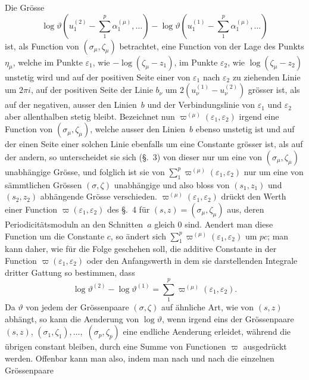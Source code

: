 \documentclass[a4paper,12pt,leqno]{article}
\begin{document}
Die Gr\"{o}sse
\[    \log \vartheta \left(
            u_1^{(2)} - \sum_1^p \alpha_1^{(\mu)},\ldots \right)
    - \log \vartheta \left(
            u_1^{(1)} - \sum_1^p \alpha_1^{(\mu)},\ldots \right) \]
ist, als Function von $(\sigma_\mu, \zeta_\mu)$ betrachtet, eine
Function von der Lage des Punkts $\eta_\mu$, welche im Punkte
$\varepsilon_1$, wie $- \log (\zeta_\mu - z_1)$, im Punkte
$\varepsilon_2$, wie $\log (\zeta_\mu - z_2)$ unstetig wird und
auf der positiven Seite einer von $\varepsilon_1$ nach
$\varepsilon_2$ zu ziehenden Linie um $2\pi i$, auf der positiven
Seite der Linie $b_\nu$ um $2(u_\nu^{(1)} - u_\nu^{(2)})$
gr\"{o}sser ist, als auf der negativen, ausser den Linien~$b$ und
der Verbindungslinie von $\varepsilon_1$ und $\varepsilon_2$ aber
allenthalben stetig bleibt.  Bezeichnet nun
$\varpi^{(\mu)} (\varepsilon_1, \varepsilon_2)$
irgend eine Function von $(\sigma_\mu, \zeta_\mu)$, welche ausser
den Linien~$b$ ebenso unstetig ist und auf der einen Seite einer
solchen Linie ebenfalls um eine Constante gr\"{o}sser ist, als
auf der andern, so unterscheidet sie sich (\S.~3) von dieser nur
um eine von $(\sigma_\mu, \zeta_\mu)$ unabh\"{a}ngige Gr\"{o}sse,
und folglich ist sie von
$\sum\limits_1^p \varpi^{(\mu)} (\varepsilon_1, \varepsilon_2)$
nur um eine von s\"{a}mmtlichen Gr\"{o}ssen $(\sigma, \zeta)$
unabh\"{a}ngige und also bloss von $(s_1, z_1)$ und $(s_2, z_2)$
abh\"{a}ngende Gr\"{o}sse verschieden.
$\varpi^{(\mu)} (\varepsilon_1, \varepsilon_2)$
dr\"{u}ckt den Werth einer Function
$\varpi (\varepsilon_1, \varepsilon_2)$
des \S.~4 f\"{u}r $(s,z) = (\sigma_\mu, \zeta_\mu)$ aus, deren
Periodicit\"{a}tsmoduln an den Schnitten~$a$ gleich $0$ sind.
Aendert man diese Function um die Constante $c$, so \"{a}ndert
sich
$\sum\limits_1^p \varpi^{(\mu)} (\varepsilon_1, \varepsilon_2)$
um $pc$; man kann daher, wie f\"{u}r die Folge geschehen soll,
die additive Constante in der Function
$\varpi (\varepsilon_1, \varepsilon_2)$
oder den Anfangswerth in dem sie darstellenden Integrale dritter
Gattung so bestimmen, dass
\[ \log \vartheta^{(2)} - \log \vartheta^{(1)}
   = \sum_1^p \varpi^{(\mu)} (\varepsilon_1, \varepsilon_2).\]
Da $\vartheta$ von jedem der Gr\"{o}ssenpaare $(\sigma, \zeta)$
auf \"{a}hnliche Art, wie von $(s,z)$ abh\"{a}ngt, so kann die
Aenderung von $\log \vartheta$, wenn irgend eins der
Gr\"{o}ssenpaare
$(s,z)$, $(\sigma_1, \zeta_1),\ldots,$ $(\sigma_p, \zeta_p)$
eine endliche Aenderung erleidet, w\"{a}hrend die \"{u}brigen
constant bleiben, durch eine Summe von Functionen
$\varpi$ ausgedr\"{u}ckt werden.  Offenbar kann man also,
indem man nach und nach die einzelnen Gr\"{o}ssenpaare
\end{document}
